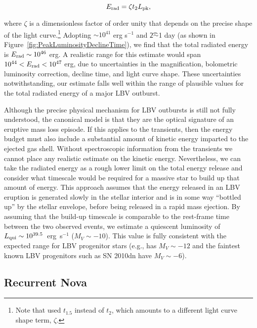 \begin{multicols}{2}
\begin{equation}
  \label{eqn:Erad}
  E_{\rm rad} = \zeta \t2 \Lpk,
\end{equation}

\noindent where $\zeta$ is a dimensionless factor of order unity that
depends on the precise shape of the light curve.\footnote{Note that
  \cite{Smith:2011b} used $t_{1.5}$ instead of $t_2$, which amounts to
  a different light curve shape term, $\zeta$.}  Adopting
\Lpk$\sim10^{41}$ erg s$^{-1}$ and \t2$\sim$1 day (as shown in
Figure~\ref{fig:PeakLuminosityDeclineTime}), we find that the total
radiated energy is $E_{\rm rad}\sim10^{46}$ erg.  A realistic range
for this estimate would span $10^{44}<E_{\rm rad}<10^{47}$ erg, due to
uncertainties in the magnification, bolometric luminosity correction,
decline time, and light curve shape. These uncertainties
notwithstanding, our estimate falls well within the range of
plausible values for the total radiated energy of a major LBV
outburst.

Although the precise physical mechanism for LBV outbursts is still not fully
understood\cite{Smith:2006,Woosley:2007,Dessart:2010}, the
canonical model is that they are the optical signature
of an eruptive mass loss episode.  If this applies to the \spock
transients, then the energy budget must also include a substantial
amount of kinetic energy imparted to the ejected gas shell. Without
spectroscopic information from the \spock transients we cannot place
any realistic estimate on the kinetic energy. Nevertheless, we can
take the radiated energy as a rough lower limit on the total energy
release and consider what timescale would be required for a massive
star to build up that amount of energy. This approach assumes that the
energy released in an LBV eruption is generated slowly in the stellar
interior and is in some way ``bottled up'' by the stellar envelope,
before being released in a rapid mass ejection.  By assuming that the
build-up timescale is comparable to the rest-frame time between the
two observed events, we estimate a quiescent luminosity of $L_{\rm
  qui}\sim10^{39.5}$~erg~s$^{-1}$ ($M_V\sim-10$).  This value is fully
consistent with the expected range for LBV progenitor stars (e.g.,
\etacar has $M_V\sim-12$ and the faintest known LBV progenitors such
as SN 2010dn have $M_V\sim-6$).


\subsection{Recurrent Nova}\label{sec:RNe}


\end{multicols}
